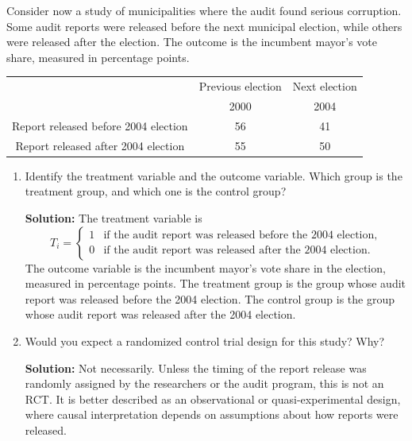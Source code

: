 \documentclass[11pt]{exam}
\begin{document}
\begin{questions}
\begin{enumerate}[leftmargin = 0.5cm, label = (\alph*), rightmargin = 0.2cm]
\end{enumerate}

\question[2.5]
Consider now a study of municipalities where the audit found serious corruption. Some audit reports were released before the next municipal election, while others were released after the election. The outcome is the incumbent mayor's vote share, measured in percentage points.

\begin{center}
\begin{tabular}{ccc}
 & Previous election & Next election \\
 & 2000 & 2004 \\
\hline
Report released before 2004 election & 56 & 41 \\
Report released after 2004 election & 55 & 50 \\
\hline
\end{tabular}
\end{center}

\begin{enumerate}[leftmargin = 0.5cm, label = (\alph*), rightmargin = 0.2cm]
    \item Identify the treatment variable and the outcome variable. Which group is the treatment group, and which one is the control group?

    \begin{solutionorbox}[5.8cm]
    \textbf{Solution:} The treatment variable is
    \[
    T_i =
    \begin{cases}
    1 & \text{if the audit report was released before the 2004 election,}\\
    0 & \text{if the audit report was released after the 2004 election.}
    \end{cases}
    \]
    The outcome variable is the incumbent mayor's vote share in the election, measured in percentage points. The treatment group is the group whose audit report was released before the 2004 election. The control group is the group whose audit report was released after the 2004 election.
    \end{solutionorbox}

    \item Would you expect a randomized control trial design for this study? Why?

    \begin{solutionorbox}[5.5cm]
    \textbf{Solution:} Not necessarily. Unless the timing of the report release was randomly assigned by the researchers or the audit program, this is not an RCT. It is better described as an observational or quasi-experimental design, where causal interpretation depends on assumptions about how reports were released.
    \end{solutionorbox}


\end{enumerate}
\end{questions}
\end{document}
